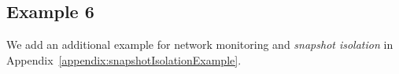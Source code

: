 \subsection{Example 6}

We add an additional example for network monitoring and \textit{snapshot isolation} in Appendix~\ref{appendix:snapshotIsolationExample}.%



